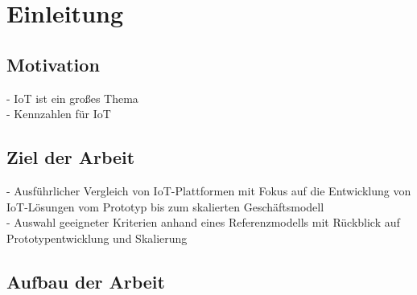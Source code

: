 \chapter{Einleitung}\label{ch:Einleitung}
\section{Motivation}\label{sec:Motivation}
- IoT ist ein großes Thema\\
- Kennzahlen für IoT\\
\section{Ziel der Arbeit}\label{sec:Ziel der Arbeit}
- Ausführlicher Vergleich von IoT-Plattformen mit Fokus auf die Entwicklung von IoT-Lösungen vom Prototyp bis zum skalierten Geschäftsmodell\\
- Auswahl geeigneter Kriterien anhand eines Referenzmodells mit Rückblick auf Prototypentwicklung und Skalierung\\
\section{Aufbau der Arbeit}\label{sec:Aufbau der Arbeit}
